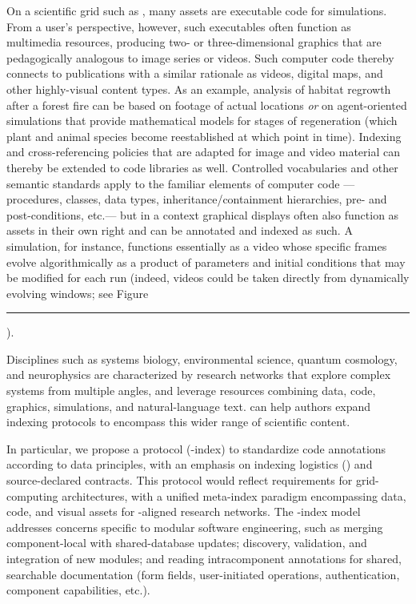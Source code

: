 \documentclass[11pt]{article}
\newcommand\reduline{\bgroup\markoverwith
{\textcolor{ru}{\rule[-.25ex]{3pt}{3.4pt}}}\ULon}
\DeclareRobustCommand{\xfigunderline}[1]{\reduline{#1}
\llap{\dashuline{\phantom{#1}}}%
}
\renewcommand{\Atref}[1]{\textcolor{rgrAt!30}{\xfigunderline{\hspace{-2pt}\autoref{#1}\hspace*{-2pt}}}}
\begin{document}
{{\begin{description}
\pseudoIndent{}  On a scientific grid such as 
\CaBIG{}, many assets are executable code 
for  simulations.  
From a user's perspective, however, such 
executables often function as multimedia 
resources, producing two- or three-dimensional 
graphics that are pedagogically analogous 
to image series or videos.  Such computer code 
thereby connects to publications with a 
similar rationale as videos, digital maps, and 
other highly-visual content types.  As an example, 
analysis of habitat regrowth after a forest 
fire can be based on footage of actual locations 
\textit{or} on agent-oriented simulations that provide 
mathematical models for stages of regeneration 
(which plant and animal species become reestablished 
at which point in time).  Indexing and cross-referencing 
policies that are adapted for image and video material 
can thereby be extended to code libraries as 
well.  Controlled vocabularies and other semantic 
standards apply to the familiar elements 
of computer code --- procedures, classes, data types, 
inheritance/containment hierarchies, pre- and post-conditions, 
etc.\@ --- but in a  context graphical displays 
often also function as assets in their own right and can 
be annotated and indexed as such.  A \ThreeD{} simulation, 
for instance, functions essentially as a video whose 
specific frames evolve algorithmically as a product 
of parameters and initial conditions that may 
be modified for each run (indeed, videos could be 
taken directly from dynamically evolving \GUI{} windows; 
see Figure~\Atref{fig:pcbi}).
  
\pseudoIndent{}  Disciplines such as systems biology, 
environmental science, quantum cosmology, and neurophysics 
are characterized by research networks that explore complex 
systems from multiple angles, and leverage resources 
combining data, code, graphics, simulations, and natural-language 
text.  \lPacTk{} can help authors expand indexing protocols 
to encompass this wider range of scientific content.  

\pseudoIndent{}  In particular, we propose a    
protocol (\Scign{}-index) to standardize 
code annotations according to \FAIR{}data principles, 
with an emphasis on indexing \GUI{} logistics () 
and source-declared contracts.  This protocol 
would reflect requirements for grid-computing 
architectures, with a unified meta-index 
paradigm encompassing data, code, and 
visual assets for \FAIR{}-aligned research networks. 
The \Scign{}-index model addresses 
concerns specific to modular software engineering, 
such as merging component-local with shared-database updates; 
discovery, validation, and integration of new modules; 
and reading intracomponent 
annotations for shared, searchable 
documentation (form fields, user-initiated 
operations, authentication, component capabilities, etc.). 
\enlargethispage{25pt}


\end{description}}}
\end{document}
